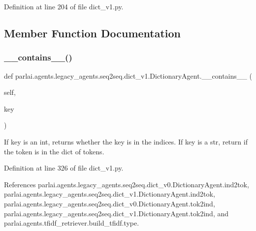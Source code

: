 Definition at line 204 of file dict\+\_\+v1.\+py.



\subsection{Member Function Documentation}
\mbox{\label{classparlai_1_1agents_1_1legacy__agents_1_1seq2seq_1_1dict__v1_1_1DictionaryAgent_ae9ff07246d32352244a121ef76789970}} 
\subsubsection{\texorpdfstring{\+\_\+\+\_\+contains\+\_\+\+\_\+()}{\_\_contains\_\_()}}
{\footnotesize\ttfamily def parlai.\+agents.\+legacy\+\_\+agents.\+seq2seq.\+dict\+\_\+v1.\+Dictionary\+Agent.\+\_\+\+\_\+contains\+\_\+\+\_\+ (\begin{DoxyParamCaption}\item[{}]{self,  }\item[{}]{key }\end{DoxyParamCaption})}

\begin{DoxyVerb}If key is an int, returns whether the key is in the indices.
If key is a str, return if the token is in the dict of tokens.
\end{DoxyVerb}
 

Definition at line 326 of file dict\+\_\+v1.\+py.



References parlai.\+agents.\+legacy\+\_\+agents.\+seq2seq.\+dict\+\_\+v0.\+Dictionary\+Agent.\+ind2tok, parlai.\+agents.\+legacy\+\_\+agents.\+seq2seq.\+dict\+\_\+v1.\+Dictionary\+Agent.\+ind2tok, parlai.\+agents.\+legacy\+\_\+agents.\+seq2seq.\+dict\+\_\+v0.\+Dictionary\+Agent.\+tok2ind, parlai.\+agents.\+legacy\+\_\+agents.\+seq2seq.\+dict\+\_\+v1.\+Dictionary\+Agent.\+tok2ind, and parlai.\+agents.\+tfidf\+\_\+retriever.\+build\+\_\+tfidf.\+type.

